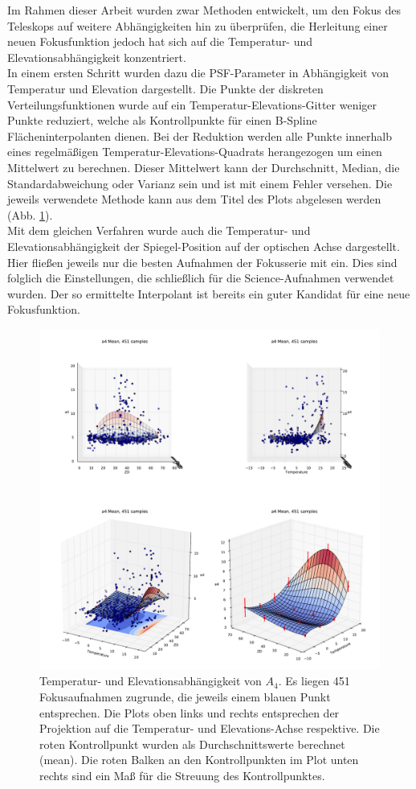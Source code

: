 Im Rahmen dieser Arbeit wurden zwar Methoden entwickelt, um den Fokus des Teleskops auf weitere Abhängigkeiten hin zu überprüfen, die Herleitung einer neuen Fokusfunktion jedoch hat sich auf die Temperatur- und Elevationsabhängigkeit konzentriert.\\
In einem ersten Schritt wurden dazu die PSF-Parameter in Abhängigkeit von Temperatur und Elevation dargestellt. Die Punkte der diskreten Verteilungsfunktionen wurde auf ein Temperatur-Elevations-Gitter weniger Punkte reduziert, welche als Kontrollpunkte für einen B-Spline Flächeninterpolanten dienen. Bei der Reduktion werden alle Punkte innerhalb eines regelmäßigen Temperatur-Elevations-Quadrats herangezogen um einen Mittelwert zu berechnen. Dieser Mittelwert kann der Durchschnitt, Median, die Standardabweichung oder Varianz sein und ist mit einem Fehler versehen. Die jeweils verwendete Methode kann aus dem Titel des Plots abgelesen werden (Abb. \ref{a4_surf}).\\
Mit dem gleichen Verfahren wurde auch die Temperatur- und Elevationsabhängigkeit der Spiegel-Position auf der optischen Achse dargestellt. Hier fließen jeweils nur die besten Aufnahmen der Fokusserie mit ein. Dies sind folglich die Einstellungen, die schließlich für die Science-Aufnahmen verwendet wurden. Der so ermittelte Interpolant ist bereits ein guter Kandidat für eine neue Fokusfunktion.

\begin{figure}[h]
	\centering
	\includegraphics[scale=.48]{psf_surf/a4_mean.pdf}
	\caption[Temperatur- und Elevationsabhängigkeit von $A_4$]{Temperatur- und Elevationsabhängigkeit von $A_4$. Es liegen 451 Fokusaufnahmen zugrunde, die jeweils einem blauen Punkt entsprechen. Die Plots oben links und rechts entsprechen der Projektion auf die Temperatur- und Elevations-Achse respektive. Die roten Kontrollpunkt wurden als Durchschnittswerte berechnet (mean). Die roten Balken an den Kontrollpunkten im Plot unten rechts sind ein Maß für die Streuung des Kontrollpunktes. }
    \label{a4_surf}
\end{figure}


